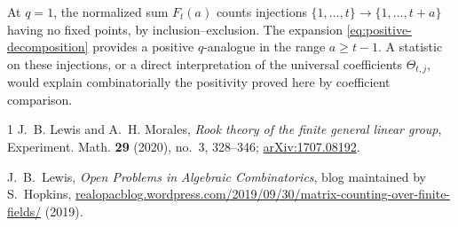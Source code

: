 \documentclass[11pt]{amsart}
\begin{document}
At $q=1$, the normalized sum $F_t(a)$ counts injections
$\{1,\ldots,t\}\to\{1,\ldots,t+a\}$ having no fixed points, by
inclusion--exclusion. The expansion \eqref{eq:positive-decomposition}
provides a positive $q$-analogue in the range $a\ge t-1$.
A statistic on these injections, or a direct interpretation of the
universal coefficients $\Theta_{t,j}$, would explain combinatorially
the positivity proved here by coefficient comparison.

\begin{thebibliography}{1}
 J.~B. Lewis and A.~H. Morales, \emph{Rook theory of the finite general linear group},
Experiment. Math. \textbf{29} (2020), no.~3, 328--346;
\href{https://arxiv.org/abs/1707.08192}{arXiv:1707.08192}.

 J.~B.~Lewis, {\it Open Problems in Algebraic Combinatorics}, blog maintained by S.~Hopkins, \href{https://realopacblog.wordpress.com/2019/09/30/matrix-counting-over-finite-fields/}{realopacblog.wordpress.com/2019/09/30/matrix-counting-over-finite-fields/} (2019).

\end{thebibliography}
\end{document}
